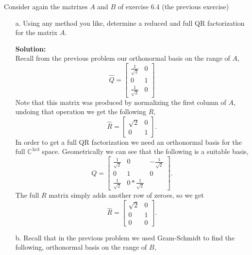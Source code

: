 \documentclass[12pt]{article}
\makeatletter
\theoremstyle{homework}
\newenvironment{exercise}[1]
{\def\@currentlabel{#1}\exercisecore}
{\endexercisecore}
\newcommand{\localhead}[1]{\par\smallskip\noindent\textbf{#1}\nobreak\\}%
\newcommand\solution{\localhead{Solution:}}
\newcommand{\Cplx}{\ensuremath{\mathbb C}}
\let\CC\Cplx
\makeatother
\begin{document}
\begin{exercise}{7.1} Consider again the matrixes $A$ and $B$ of exercise 6.4 (the previous exercise)\\
  \begin{enumerate}
    \item[a.] Using any method you like, determine a reduced and full QR factorization for the matrix $A$.\\
    \solution Recall from the previous problem our orthonormal basis on the range of $A$,
    \begin{equation*}
      \hat{Q} =  \begin{bmatrix}
        \frac{1}{\sqrt{2}} & 0\\
        0 & 1\\
        \frac{1}{\sqrt{2}} & 0
      \end{bmatrix}
    \end{equation*}
    Note that this matrix was produced by normalizing the first column of $A$, undoing that operation we get the following $R$,
    \begin{equation*}
      \hat{R} = \begin{bmatrix}
        \sqrt{2} & 0\\
        0 & 1
      \end{bmatrix}.
    \end{equation*}
    In order to get a full QR factorization we need an orthonormal basis for the full $\CC^{3x3}$ space. Geometrically we can see that the 
    following is a suitable basis, 
    \begin{equation*}
      Q = 
      \begin{bmatrix}
        \frac{1}{\sqrt{2}} & 0 & -\frac{1}{\sqrt{2}}\\
        0 & 1 & 0\\
        \frac{1}{\sqrt{2}} & 0 * \frac{1}{\sqrt{2}}
      \end{bmatrix}.
    \end{equation*}
    The full $R$ matrix simply adds another row of zeroes, so we get
    \begin{equation*}
      \hat{R} = \begin{bmatrix}
        \sqrt{2} & 0\\
        0 & 1\\
        0 & 0
      \end{bmatrix}.
    \end{equation*}
    \vspace{.15in}
    \item[b.] Recall that in the previous problem we used Gram-Schmidt to find the following, orthonormal basis on the range of $B$,  

\end{enumerate}
\end{exercise}
\end{document}
